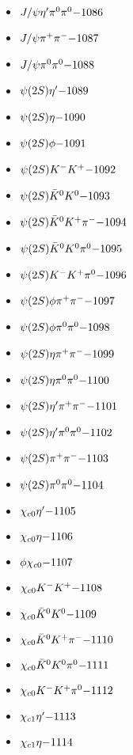 \begin{multicols}{3}
\begin{itemize}
 \item $ J/\psi {\eta^{\prime}} \pi^{0} \pi^{0} \hfill{-1086}$
 \item $ J/\psi \pi^{+} \pi^{-} \hfill{-1087}$
 \item $ J/\psi \pi^{0} \pi^{0} \hfill{-1088}$
 \item $ \psi(2S) {\eta^{\prime}} \hfill{-1089}$
 \item $ \psi(2S) \eta \hfill{-1090}$
 \item $ \psi(2S) \phi \hfill{-1091}$
 \item $ \psi(2S) K^{-} K^{+} \hfill{-1092}$
 \item $ \psi(2S) \bar{K}^{0} K^{0} \hfill{-1093}$
 \item $ \psi(2S) \bar{K}^{0} K^{+} \pi^{-} \hfill{-1094}$
 \item $ \psi(2S) \bar{K}^{0} K^{0} \pi^{0} \hfill{-1095}$
 \item $ \psi(2S) K^{-} K^{+} \pi^{0} \hfill{-1096}$
 \item $ \psi(2S) \phi \pi^{+} \pi^{-} \hfill{-1097}$
 \item $ \psi(2S) \phi \pi^{0} \pi^{0} \hfill{-1098}$
 \item $ \psi(2S) \eta \pi^{+} \pi^{-} \hfill{-1099}$
 \item $ \psi(2S) \eta \pi^{0} \pi^{0} \hfill{-1100}$
 \item $ \psi(2S) {\eta^{\prime}} \pi^{+} \pi^{-} \hfill{-1101}$
 \item $ \psi(2S) {\eta^{\prime}} \pi^{0} \pi^{0} \hfill{-1102}$
 \item $ \psi(2S) \pi^{+} \pi^{-} \hfill{-1103}$
 \item $ \psi(2S) \pi^{0} \pi^{0} \hfill{-1104}$
 \item $ \chi_{c0} {\eta^{\prime}} \hfill{-1105}$
 \item $ \chi_{c0} \eta \hfill{-1106}$
 \item $ \phi \chi_{c0} \hfill{-1107}$
 \item $ \chi_{c0} K^{-} K^{+} \hfill{-1108}$
 \item $ \chi_{c0} \bar{K}^{0} K^{0} \hfill{-1109}$
 \item $ \chi_{c0} \bar{K}^{0} K^{+} \pi^{-} \hfill{-1110}$
 \item $ \chi_{c0} \bar{K}^{0} K^{0} \pi^{0} \hfill{-1111}$
 \item $ \chi_{c0} K^{-} K^{+} \pi^{0} \hfill{-1112}$
 \item $ \chi_{c1} {\eta^{\prime}} \hfill{-1113}$
 \item $ \chi_{c1} \eta \hfill{-1114}$

\end{itemize}
\end{multicols}
